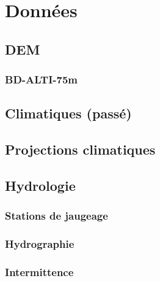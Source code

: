 
\chapter{Données}
\label{chap:donnees}

\minitableofcontents

\newpage


\section{DEM}
\label{sec:DEM}

\subsection{BD-ALTI-75m}
\label{sec:BD-ALTI-75m}

\section{Climatiques (passé)}
\label{sec:climatiques}

\section{Projections climatiques}
\label{sec:projection_climatiques}

\section{Hydrologie}
\label{sec:hydrologie}

\subsection{Stations de jaugeage}
\label{sec:stations_de_jaugeage}

\subsection{Hydrographie}
\label{sec:hydrographie}

\subsection{Intermittence}
\label{sec:intermittence}

